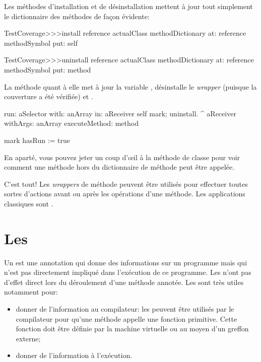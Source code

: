 \documentclass[a4paper,10pt,twoside]{book}
\begin{document}
Les méthodes d'installation et de désinstallation mettent à jour tout simplement le dictionnaire des méthodes de façon évidente:
\begin{code}{}
TestCoverage>>>install
	reference actualClass methodDictionary
		at: reference methodSymbol
		put: self

TestCoverage>>>uninstall
	reference actualClass methodDictionary
		at: reference methodSymbol
		put: method
\end{code}
\noindent
La méthode  quant à elle met à jour la variable , désinstalle le \emph{wrapper} (puisque la couverture a été vérifiée) et . %
\begin{code}{}
run: aSelector with: anArray in: aReceiver
	self mark; uninstall.
	^ aReceiver withArgs: anArray executeMethod: method

mark
	hasRun := true
\end{code}
En aparté, vous pouvez jeter un coup d'\oe il à la méthode de classe
 pour voir comment
une méthode hors du dictionnaire de méthode peut être appelée.

C'est tout!
Les \emph{wrappers} de méthode peuvent être utilisés pour effectuer toutes sortes d'actions avant ou après les opérations d'une méthode.  Les applications classiques sont .

\section{Les \pragmas}

Un  est une annotation qui donne des informations sur un programme mais qui n'est pas directement impliqué dans l'exécution de ce programme. Les \pragmas n'ont pas d'effet direct lors du déroulement d'une méthode annotée.
Les \pragmas sont très utiles notamment pour:
\begin{itemize}
\item donner de l'information au compilateur: les  peuvent être utilisés par le compilateur pour qu'une méthode appelle une fonction primitive. Cette fonction doit être définie par la machine virtuelle ou au moyen d'un greffon externe;
\item donner de l'information à l'exécution.
\end{itemize}
\end{document}
